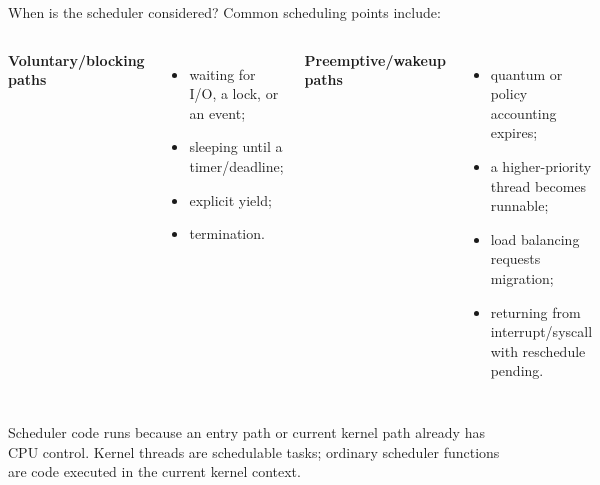 \documentclass[aspectratio=169,11pt]{beamer}
\begin{document}
\begin{frame}{When is the scheduler considered?}
  Common scheduling points include:
  \begin{columns}[T,onlytextwidth]
      \textbf{Voluntary/blocking paths}
      \begin{itemize}
        \item waiting for I/O, a lock, or an event;
        \item sleeping until a timer/deadline;
        \item explicit yield;
        \item termination.
      \end{itemize}
      \textbf{Preemptive/wakeup paths}
      \begin{itemize}
        \item quantum or policy accounting expires;
        \item a higher-priority thread becomes runnable;
        \item load balancing requests migration;
        \item returning from interrupt/syscall with reschedule pending.
      \end{itemize}
  \end{columns}
  \begin{tcolorbox}[title=Kernel execution is not a paradox]
    Scheduler code runs because an entry path or current kernel path already has CPU control. Kernel threads are schedulable tasks; ordinary scheduler functions are code executed in the current kernel context.
  \end{tcolorbox}
\end{frame}
\end{document}
